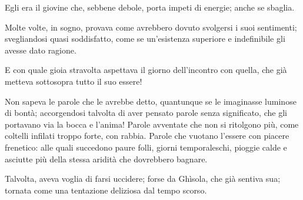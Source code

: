 Egli era il giovine che, sebbene debole, porta impeti di energie; anche se sbaglia.

Molte volte, in sogno, provava come avrebbero dovuto svolgersi i suoi sentimenti; svegliandosi quasi soddisfatto, come se un’esistenza superiore e indefinibile gli avesse dato ragione.

E con quale gioia stravolta aspettava il giorno dell’incontro con quella, che già metteva sottosopra tutto il suo essere!

Non sapeva le parole che le avrebbe detto, quantunque se le imaginasse luminose di bontà; accorgendosi talvolta di aver pensato parole senza significato, che gli portavano via la bocca e l’anima! Parole avventate che non si ritolgono più, come coltelli infilati troppo forte, con rabbia. Parole che vuotano l'essere con piacere frenetico: alle quali succedono paure folli, giorni temporaleschi, pioggie calde e asciutte più della stessa aridità che dovrebbero bagnare.

Talvolta, aveva voglia di farsi uccidere; forse da Ghìsola, che già sentiva sua; tornata come una tentazione deliziosa dal tempo scorso.
